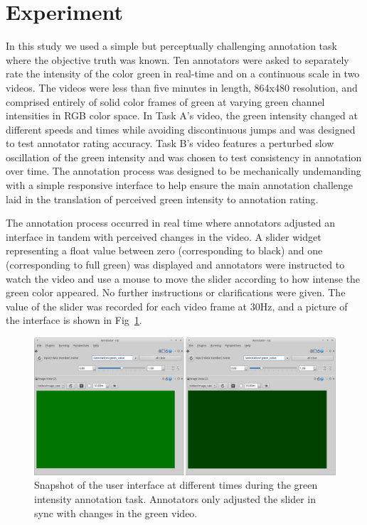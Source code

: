 \documentclass[10pt,letterpaper]{article}
\def \imagewidth {7.5in}
\begin{document}
\section*{Experiment}
In this study we used a simple but perceptually challenging annotation task where the objective truth was known.  Ten annotators were asked to separately rate the intensity of the color green in real-time and on a continuous scale in two videos.  The videos were less than five minutes in length, 864x480 resolution, and comprised entirely of solid color frames of green at varying green channel intensities in RGB color space.  In Task A's video, the green intensity changed at different speeds and times while avoiding discontinuous jumps and was designed to test annotator rating accuracy.  Task B's video features a perturbed slow oscillation of the green intensity and was chosen to test consistency in annotation over time.  The annotation process was designed to be mechanically undemanding with a simple responsive interface to help ensure the main annotation challenge laid in the translation of perceived green intensity to annotation rating.

The annotation process occurred in real time where annotators adjusted an interface in tandem with perceived changes in the video.  A slider widget representing a float value between zero (corresponding to black) and one (corresponding to full green) was displayed and annotators were instructed to watch the video and use a mouse to move the slider according to how intense the green color appeared.  No further instructions or clarifications were given. The value of the slider was recorded for each video frame at 30Hz, and a picture of the interface is shown in Fig~\ref{Fig:annotation_ui}.

\begin{figure}[t]
    \begin{adjustwidth}{-2.25in}{0in}
	\centering
	\includegraphics[width=\imagewidth]{images/green_ui.eps}
	\caption{Snapshot of the user interface at different times during the green intensity annotation task.  Annotators only adjusted the slider in sync with changes in the green video.}
	\label{Fig:annotation_ui}
	\end{adjustwidth}
\end{figure}
\end{document}
